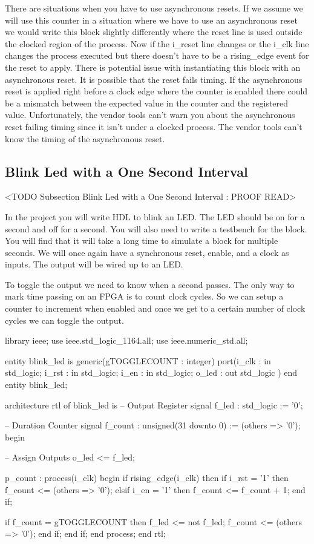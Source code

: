 There are situations when you have to use asynchronous resets. If we assume we will use this counter in a situation where we have to use an asynchronous reset we would write this block slightly differently where the reset line is used outside the clocked region of the process. Now if the i\_reset line changes or the i\_clk line changes the process executed but there doesn't have to be a rising\_edge event for the reset to apply. There is potential issue with instantiating this block with an asynchronous reset. It is possible that the reset fails timing. If the asynchronous reset is applied right before a clock edge where the counter is enabled there could be a mismatch between the expected value in the counter and the registered value. Unfortunately, the vendor tools can't warn you about the asynchronous reset failing timing since it isn't under a clocked process. The vendor tools can't know the timing of the asynchronous reset.	
	
	
	
\subsection{Blink Led with a One Second Interval}
	<TODO Subsection Blink Led with a One Second Interval : PROOF READ>

In the project you will write \ac{HDL} to blink an LED. The LED should be on for a second and off for a second. You will also need to write a testbench for the block. You will find that it will take a long time to simulate a block for multiple seconds. We will once again have a synchronous reset, enable, and a clock as inputs. The output will be wired up to an LED.

To toggle the output we need to know when a second passes. The only way to mark time passing on an \ac{FPGA} is to count clock cycles. So we can setup a counter to increment when enabled and once we get to a certain number of clock cycles we can toggle the output. 

\begin{VHDLlisting}[tabsize=8]
library ieee;
  use ieee.std_logic_1164.all;
  use ieee.numeric_std.all;
  
entity blink_led is
generic(gTOGGLECOUNT : integer)
port(i_clk   : in    std_logic;
	 i_rst   : in    std_logic;
	 i_en    : in    std_logic;
	 o_led   :   out std_logic	
)
end entity blink_led;

architecture rtl of blink_led is
	-- Output Register
	signal f_led   : std_logic := '0';

	-- Duration Counter
	signal f_count : unsigned(31 downto 0) := (others => '0');
begin

	-- Assign Outputs
	o_led <= f_led;

	p_count : process(i_clk)
	begin
		if rising_edge(i_clk) then
			if i_rst = '1' then
				f_count <= (others => '0');
			elsif i_en = '1' then
				f_count <= f_count + 1;
			end if;	

			if f_count = gTOGGLECOUNT then
				f_led <= not f_led;
				f_count <= (others => '0');
			end if;			
		end if;
	end process;
end rtl;

\end{VHDLlisting}

